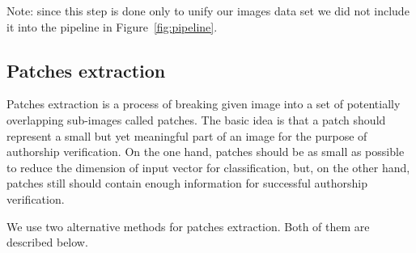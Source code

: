 \documentclass[conference,a4paper]{ieeetran}
\begin{document}
Note: since this step is done only to unify our images data set we did not include it into the pipeline in Figure~\ref{fig:pipeline}.

\subsection{Patches extraction}
Patches extraction is a process of breaking given image into a set of potentially overlapping sub-images called patches. The basic idea is that a patch should represent a small but yet meaningful part of an image for the purpose of authorship verification. On the one hand, patches should be as small as possible to reduce the dimension of input vector for classification, but, on the other hand, patches still should contain enough information for successful authorship verification.  

We use two alternative methods for patches extraction. Both of them are described below.
\end{document}
